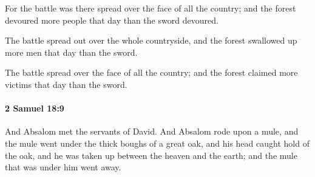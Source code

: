 			\begin{versebox}
					\item[BHS] 
					\item[ASV] For the battle was there spread over the face of all the country; and the forest devoured more people that day than the sword devoured.
					\item[NIV] The battle spread out over the whole countryside, and the forest swallowed up more men that day than the sword.
					\item[NRSV] The battle spread over the face of all the country; and the forest claimed more victims that day than the sword.
			\end{versebox}

		\paragraph{2 Samuel 18:9} %
			\label{2SAMUEL-18-9}

			And Absalom met the servants of David. And Absalom rode upon a mule, and the mule went under the thick boughs of a great oak, and his head caught hold of the oak, and he was taken up between the heaven and the earth; and the mule that was under him went away.

